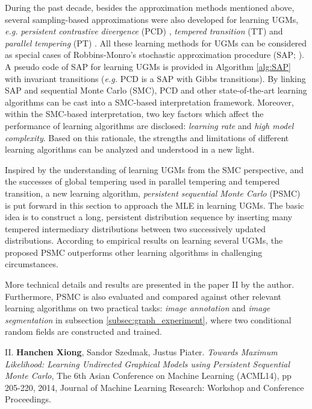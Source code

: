 During the past decade, besides the approximation methods mentioned above, several sampling-based approximations were also developed for learning 
UGMs, \emph{e.g.} \emph{persistent contrastive divergence} (PCD) \citep{tielemanPcd2008},  \emph{tempered transition} (TT) \citep{Salakhutdinov_learningin} and 
\emph{parallel tempering} (PT) \citep{desjardins2010}. 
All these learning methods for
UGMs can be considered as special cases of Robbins-Monro’s stochastic approximation procedure (SAP; \citealt{RobbinMonro,Younes1988}). A pseudo code of SAP for learning UGMs is provided in Algorithm \ref{alg:SAP}  
with invariant transitions (\emph{e.g.} PCD is a SAP with Gibbs transitions). By linking SAP
and sequential Monte Carlo (SMC), PCD and other state-of-the-art learning algorithms can be cast into a
SMC-based interpretation framework. Moreover, within the SMC-based interpretation, two key factors
which affect the performance of learning algorithms are disclosed: \emph{learning rate} and \emph{high model complexity}.
Based on this rationale, the strengths and limitations of different learning algorithms can be analyzed
and understood in a new light.

Inspired by the understanding of learning UGMs from the SMC perspective, and the successes of global
tempering used in parallel tempering and tempered transition, a new learning algorithm, \emph{persistent sequential Monte Carlo} (PSMC) is put forward in this section to approach the
MLE in learning UGMs. The basic idea is to construct a long, persistent distribution sequence by 
inserting many tempered intermediary distributions between two successively updated
distributions. According to empirical results on learning several UGMs, the proposed PSMC outperforms other learning algorithms in challenging circumstances.

More technical details and results are presented in the paper II by the author. Furthermore, PSMC is also evaluated and compared against other relevant learning algorithms 
on two practical tasks: \emph{image annotation} and \emph{image segmentation} in 
subsection \ref{subsec:graph_experiment}, where two conditional random fields are constructed and trained.    


\begin{shaded}
{\Huge II.} \textbf{Hanchen Xiong}, Sandor Szedmak, Justus Piater. {\it Towards Maximum Likelihood: Learning Undirected Graphical Models using Persistent Sequential Monte Carlo}, The 6th Asian Conference on Machine Learning (ACML14), pp 205-220, 2014, Journal of Machine Learning Research: Workshop and Conference Proceedings.   
\end{shaded}


